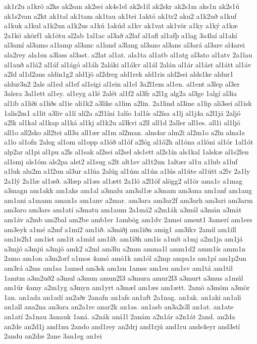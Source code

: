 {ak1r2u
a1krö
a2ks
ak2san
ak2sei
ak4s1el
ak2s1il
ak2skr
ak2s1m
aks1n
ak2s1ú
ak1s2van
a2kt
ak1tal
ak1tam
ak1tau
ak1tei
1aktó
ak1tr2
aku2
a1k2uð
a1kuf
a1kuk
a1kul
a1k2un
a1k2us
a1kú
1akúd
a1kv
ak1vat
ak1vör
a1ky
a1ký
a1kæ
2a1kö
akörf1
ak1ötu
al2ab
1al1ac
al3að
a2laf
al1afl
al1afþ
a1lag
3a4laí
al1akí
al3amí
al3amo
a1lamp
al3anc
a1land
a3lang
al3ano
al3ans
al3ará
al3are
al4arei
ala2rey
ala1sn
a3lass
al3ast.
a2lat
al1at.
ala1ta
al1atb
al1atg
al3ato
al1atv
2a1lau
al1auð
a1lá2
al1áf
al1ágó
al1áh
2aláki
al1ákv
al1ál
2alán
al1ár
al1ást
al1átt
al1áv
a2ld
al1d2ans
aldin1g2
ald1jö
al2dreg
ald1rek
ald1ris
ald2sei
alds1ke
aldur1
aldur3n2
2ale
al1ed
al1ef
al1eigi
al1ein
al1el
3a2l1em
al1en.
al1ent
a3lep
al3er
3alera
3al1ett
al1ey.
al1eyg
a1lé
2alét
al1f2
al3fr
a2l1g
alg2a
al3ge
1algí
al3ia
al1ib
a1liði
a1liðs
al1ie
ali1k2
a3like
a1lim
a2lin.
2a1lind
al3ine
a1lip
ali3sei
al1isk
1alis2m1
a1lit
a3liv
a1lí
alí2a
a2l1íni
1alío
1al1ís
al2ísa
a1lj
al1j4a
a2l1já
2aljó
a2lk
al1kal
al1kap
al1ká
al1kj
al1k2u
al3kvi
a2ll
all1d
2aller
all1es.
all1i
al1ljó
all1o
all2sko
all2tei
all3u
all1ær
al1m
al2man.
alm4ar
alm2i
al2m1o
a2ln
alna1s
a1lo
al1ofn
2alog
al1om
al1opp
a1lóð
al1óf
a2lóg
al1ó2h
al1óna
a1lóni
al1ór
1al1ót
alp2ar
al1pi
al1pu
a2ls
al1sak
al2sei
al2sel
als1ett
al2s1ín
als1kal
1alskæ
al1s2len
al1smj
als1óm
als2pa
alst2
al1sug
a2lt
alt1sv
al1t2un
1altær
al1u
a1lub
a1luf
a1luk
alu2m
a1l2un
al3ur
a1lúa
2alúg
al1úm
al1ún
a1lús
al1úte
al1útt
a2lv
2a1ly
2a1lý
2a1læ
al1æð.
a3læp
al1æs
al1ætt
2a1lö
a2l1öf
alögg2
al1ör
ama1c
a1mag
a3magn
am1akk
am1aks
am1al
a3malu
am3al1æ
a3mam
am3ana
am1anf
am1ang
am1ani
a1mann
aman1s
am1anv
a2mar.
am3ara
am3ar2f
am3arh
am3ari
am3arm
am3aro
am3ars
am1atí
a3matu
am1aum
2a1má2
a2m1ák
a3mál
a3mán
a3mát
am1áv
a2mb
am2bal
am2be
amb1er
1ambög
am1dv
2amei
ament1
3amerí
am1ers
am3eyk
a1mé
a2mf
a1mi2
am1ið.
a3miðj
am1iðn
amig1
am3ikv
2amil
am1ill
am1is2h1
am1ist
am1it
a1míd
am1íð.
am1íðh
am1ís
a1mít
a1mj
a2m1ja
am1já
a3mjó
a3mjú
a3mjö
amk2
a2ml
am3lu
a2mm
amma1l
amm1d2
amm1ís
amm1n
2amo
am1on
a3m2orf
a1mos
4amó
amó1k
am1ól
a2mp
ampa1s
am1pí
am1p2un
am3rá
a2ms
am1sa
1amsd
am3sk
am1sn
1amss
am1su
am1sv
am1tá
am1til
1amtm
a3m2uð2
a3mul
a3mun
amun2l3
a3mura
amur2l3
a3murt
a3mus
a1múl
am1úr
4amy
a2m1yg
a3myn
am1yrt
a3mæl
am1æs
am1ætt.
2amö
a3möm
a3mör
1an.
an1ada
an1adí
an2aðr
2anafn
an1afs
an1aft
2a1nag.
an1ak.
an1aki
an1ali
an1all
ana2na
an3ara
an2a1re
anar2k
an1as.
an1asb
an3a2s3l
an1at.
an1ate
an1atí
2a1nau
3anauk
1aná.
a2nák
aná1l
2anám
a2n1ár
a2n1át
2and.
an2da
an2de
an2d1j
and1nu
2ando
and1rey
an2drj
and1rjú
and1ru
ands4eyr
and3stí
2andu
an2dæ
2ane
3an1eg
an1ei
}
